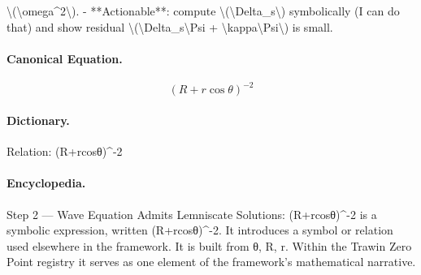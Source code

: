 \textbackslash{}(\textbackslash{}omega\textasciicircum{}2\textbackslash{}). - **Actionable**: compute \textbackslash{}(\textbackslash{}Delta\_s\textbackslash{}) symbolically (I can do that) and show residual \textbackslash{}(\textbackslash{}Delta\_s\textbackslash{}Psi + \textbackslash{}kappa\textbackslash{}Psi\textbackslash{}) is small.

\paragraph{Canonical Equation.}
\[
(R+r\cos\theta)^{-2}
\]

\paragraph{Dictionary.}
Relation: (R+rcosθ)\textasciicircum{}-2

\paragraph{Encyclopedia.}
Step 2 — Wave Equation Admits Lemniscate Solutions: (R+rcosθ)\textasciicircum{}-2 is a symbolic expression, written (R+rcosθ)\textasciicircum{}-2. It introduces a symbol or relation used elsewhere in the framework. It is built from θ, R, r. Within the Trawin Zero Point registry it serves as one element of the framework's mathematical narrative.
